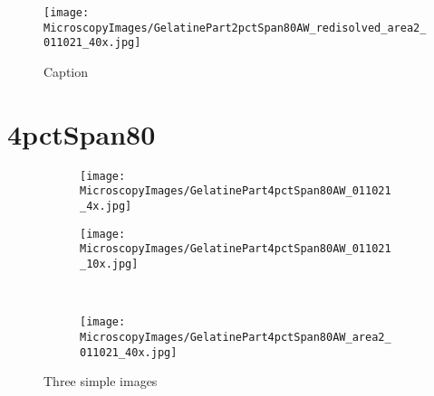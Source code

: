 \begin{figure}[H]
    \centering    \texttt{[image: MicroscopyImages/GelatinePart2pctSpan80AW\_redisolved\_area2\_011021\_40x.jpg]}
    \caption{Caption}
    \label{fig:GelatinePart2pctSpanRedis40x}
\end{figure}

\section{4pctSpan80}

\begin{figure}[H]
     \centering
     \begin{subfigure}[b]{0.49\textwidth}
         \centering
         \texttt{[image: MicroscopyImages/GelatinePart4pctSpan80AW\_011021\_4x.jpg]}
         \caption{}
         \label{fig:GelatinePart4pctSpan4x}
     \end{subfigure}
     \hfill
     \begin{subfigure}[b]{0.49\textwidth}
         \centering
         \texttt{[image: MicroscopyImages/GelatinePart4pctSpan80AW\_011021\_10x.jpg]}
         \caption{}
         \label{fig:GelatinePart4pctSpan10x}
     \end{subfigure}
     \\
     \vspace{4pt}
     \begin{subfigure}[b]{0.49\textwidth}
         \centering
         \texttt{[image: MicroscopyImages/GelatinePart4pctSpan80AW\_area2\_011021\_40x.jpg]}
         \caption{}
         \label{fig:GelatinePart4pctSpan40x}
     \end{subfigure}
        \caption{Three simple images}
        \label{fig:GelatinePart4pctSpan}
\end{figure}